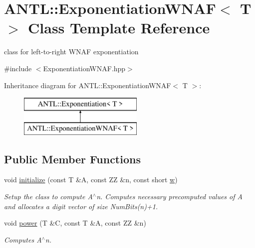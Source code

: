 \hypertarget{classANTL_1_1ExponentiationWNAF}{\section{A\-N\-T\-L\-:\-:Exponentiation\-W\-N\-A\-F$<$ T $>$ Class Template Reference}
\label{classANTL_1_1ExponentiationWNAF}
}


class for left-\/to-\/right W\-N\-A\-F exponentiation  




{\ttfamily \#include $<$Exponentiation\-W\-N\-A\-F.\-hpp$>$}

Inheritance diagram for A\-N\-T\-L\-:\-:Exponentiation\-W\-N\-A\-F$<$ T $>$\-:\begin{figure}[H]
\begin{center}
\leavevmode
\includegraphics[height=2.000000cm]{d3/d45/classANTL_1_1ExponentiationWNAF}
\end{center}
\end{figure}
\subsection*{Public Member Functions}
\begin{DoxyCompactItemize}
\item 
void \hyperlink{classANTL_1_1ExponentiationWNAF_a4e34446d4c8859f2fdf35b1b983e2029}{initialize} (const T \&A, const Z\-Z \&n, const short \hyperlink{classANTL_1_1ExponentiationWNAF_aeeeaf680db26d52f56783a6a5a761066}{w})
\begin{DoxyCompactList}\small\item\em Setup the class to compute A$^\wedge$n. Computes necessary precomputed values of A and allocates a digit vector of size Num\-Bits(n)+1. \end{DoxyCompactList}\item 
void \hyperlink{classANTL_1_1ExponentiationWNAF_a63941859ba7c0118dadd33aa489a75c7}{power} (T \&C, const T \&A, const Z\-Z \&n)
\begin{DoxyCompactList}\small\item\em Computes A$^\wedge$n. \end{DoxyCompactList}\end{DoxyCompactItemize}
